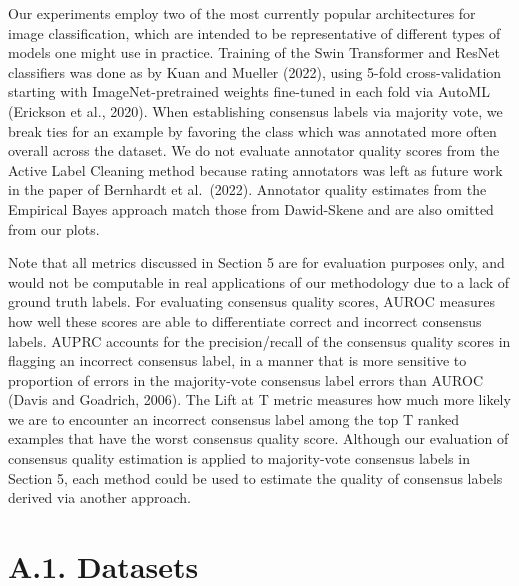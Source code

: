 \documentclass[
]{article}
\begin{document}
Our experiments employ two of the most currently popular architectures
for image classification, which are intended to be representative of
different types of models one might use in practice. Training of the
Swin Transformer and ResNet classifiers was done as by Kuan and Mueller
(2022), using 5-fold cross-validation starting with ImageNet-pretrained
weights fine-tuned in each fold via AutoML (Erickson et al., 2020). When
establishing consensus labels via majority vote, we break ties for an
example by favoring the class which was annotated more often overall
across the dataset. We do not evaluate annotator quality scores from the
Active Label Cleaning method because rating annotators was left as
future work in the paper of Bernhardt et al.~(2022). Annotator quality
estimates from the Empirical Bayes approach match those from Dawid-Skene
and are also omitted from our plots.

Note that all metrics discussed in Section 5 are for evaluation purposes
only, and would not be computable in real applications of our
methodology due to a lack of ground truth labels. For evaluating
consensus quality scores, AUROC measures how well these scores are able
to differentiate correct and incorrect consensus labels. AUPRC accounts
for the precision/recall of the consensus quality scores in flagging an
incorrect consensus label, in a manner that is more sensitive to
proportion of errors in the majority-vote consensus label errors than
AUROC (Davis and Goadrich, 2006). The Lift at T metric measures how much
more likely we are to encounter an incorrect consensus label among the
top T ranked examples that have the worst consensus quality score.
Although our evaluation of consensus quality estimation is applied to
majority-vote consensus labels in Section 5, each method could be used
to estimate the quality of consensus labels derived via another
approach.

\section{A.1. Datasets}\label{a.1.-datasets}
\end{document}
